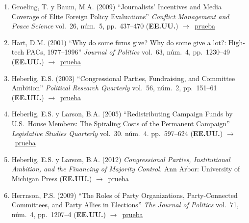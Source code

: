 \documentclass[12 pt, letter]{article}
\newenvironment{CitasMiTrabajo}{
    \begin{footnotesize}
    \begin{enumerate}[label={\footnotesize\emph{cita~\arabic*}},ref=\arabic*] %
        \setlength{\itemsep}{.1\itemsep}
        \setlength{\parskip}{.1\parskip}
    }{\end{enumerate}\end{footnotesize}}
\begin{document}
\begin{CitasMiTrabajo}
        \item Groeling, T. y Baum, M.A. (2009) ``Journalists' Incentives and Media Coverage of Elite Foreign Policy Evaluations''
            \emph{Conflict Management and Peace Science} vol.\ 26, n\'um.\ 5, pp.\ 437--470 (\textbf{EE.UU.}) $\rightarrow$~\href{https://github.com/emagar/cv/blob/master/citasMiTrab/coxMagar/groeling+baumJournalists2009.pdf}{prueba}

        \item Hart, D.M. (2001)
        ``Why do some firms give? Why do some give a lot?: High-tech PACs, 1977--1996'' \emph{Journal of Politics} vol.\ 63, n\'um.\ 4, pp.\ 1230--49
        (\textbf{EE.UU.}) $\rightarrow$~\href{https://github.com/emagar/cv/blob/master/citasMiTrab/coxMagar/hart.pdf}{prueba}

        \item Heberlig, E.S. (2003)
        ``Congressional Parties, Fundraising, and Committee Ambition'' \emph{Political Research Quarterly} vol.\ 56, n\'um.\ 2, pp.\ 151--61
        (\textbf{EE.UU.}) $\rightarrow$~\href{https://github.com/emagar/cv/blob/master/citasMiTrab/coxMagar/heber.pdf}{prueba}

       \item Heberlig, E.S. y Larson, B.A. (2005) ``Redistributing Campaign Funds by U.S.\ House Members: The Spiraling Costs of the Permanent Campaign'' \emph{Legislative Studies Quarterly} vol.\ 30. n\'um.\ 4. pp.\ 597--624 (\textbf{EE.UU.}) $\rightarrow$~\href{https://github.com/emagar/cv/blob/master/citasMiTrab/coxMagar/heberlig+larson2005lsq.excerpt.pdf}{prueba}

       \item Heberlig, E.S. y Larson, B.A. (2012) \emph{Congressional Parties, Institutional Ambition, and the Financing of Majority Control.} Ann Arbor: University of Michigan Press (\textbf{EE.UU.}) $\rightarrow$~\href{https://books.google.com.mx/books?hl=en&lr=&id=nYNN-qUDQ0cC&oi=fnd&pg=PR7&dq=Congressional+Parties,+Institutional+Ambition,+and+the+Financing+of+Majority+Control&ots=_-XB6FpJmp&sig=oD_Tf0yX2oB9XE17qHYFoJZ7aGY&redir_esc=y#v=onepage&q=magar&f=false}{prueba}

        \item Herrnson, P.S. (2009) ``The Roles of Party Organizations, Party-Connected Committees, and Party Allies in Elections'' \emph{The Journal of Politics} vol.\ 71, n\'um.\ 4, pp.\ 1207--4 (\textbf{EE.UU.}) $\rightarrow$~\href{https://github.com/emagar/cv/blob/master/citasMiTrab/coxMagar/herrnsonPartyOrginEls2009jop.pdf}{prueba}
          

\end{CitasMiTrabajo}
\end{document}
